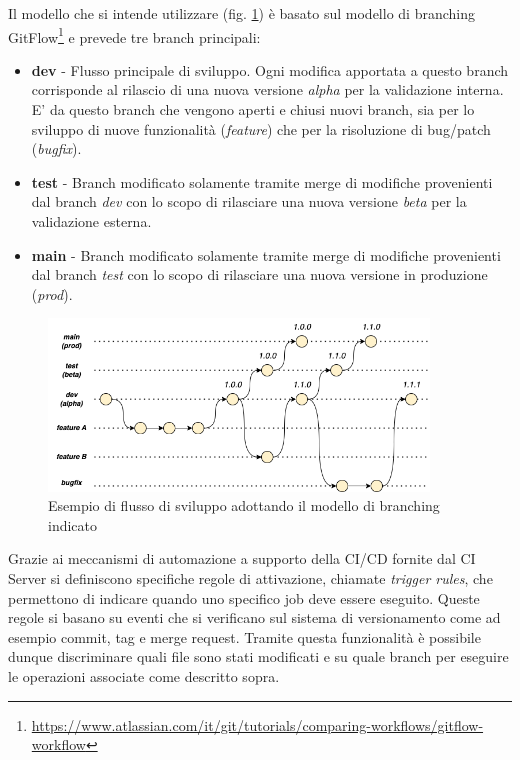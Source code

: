 Il modello che si intende utilizzare (fig. \ref{branching}) è basato sul modello di branching GitFlow\footnote{\href{https://www.atlassian.com/it/git/tutorials/comparing-workflows/gitflow-workflow}{https://www.atlassian.com/it/git/tutorials/comparing-workflows/gitflow-workflow}} e prevede tre branch principali:

\begin{itemize}
    \item \textbf{dev} - Flusso principale di sviluppo. Ogni modifica apportata a questo branch corrisponde al rilascio di una nuova versione \textit{alpha} per la validazione interna. E' da questo branch che vengono aperti e chiusi nuovi branch, sia per lo sviluppo di nuove funzionalità (\textit{feature}) che per la risoluzione di bug/patch (\textit{bugfix}).
    \item \textbf{test} - Branch modificato solamente tramite merge di modifiche provenienti dal branch \textit{dev} con lo scopo di rilasciare una nuova versione \textit{beta} per la validazione esterna.
    \item \textbf{main} - Branch modificato solamente tramite merge di modifiche provenienti dal branch \textit{test} con lo scopo di rilasciare una nuova versione in produzione (\textit{prod}).
\end{itemize}

\begin{figure}[H]
    \centering
    \includegraphics[width=0.9\textwidth]{img/branching-model.png}
    \caption{Esempio di flusso di sviluppo adottando il modello di branching indicato}
    \label{branching}
\end{figure}

Grazie ai meccanismi di automazione a supporto della CI/CD fornite dal CI Server si definiscono specifiche regole di attivazione, chiamate \textit{trigger rules}, che permettono di indicare quando uno specifico job deve essere eseguito. Queste regole si basano su eventi che si verificano sul sistema di versionamento come ad esempio commit, tag e merge request. Tramite questa funzionalità è possibile dunque discriminare quali file sono stati modificati e su quale branch per eseguire le operazioni associate come descritto sopra.

